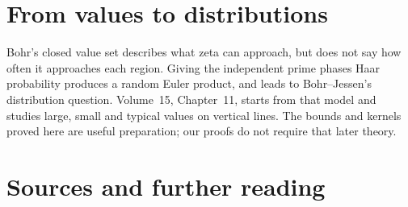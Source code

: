 \section{From values to distributions}

Bohr's closed value set describes what zeta can approach, but does not say how often it approaches each region. Giving the independent prime phases Haar probability produces a random Euler product, and leads to Bohr--Jessen's distribution question. Volume~15, Chapter~11, starts from that model and studies large, small and typical values on vertical lines. The bounds and kernels proved here are useful preparation; our proofs do not require that later theory.

\section*{Sources and further reading}

